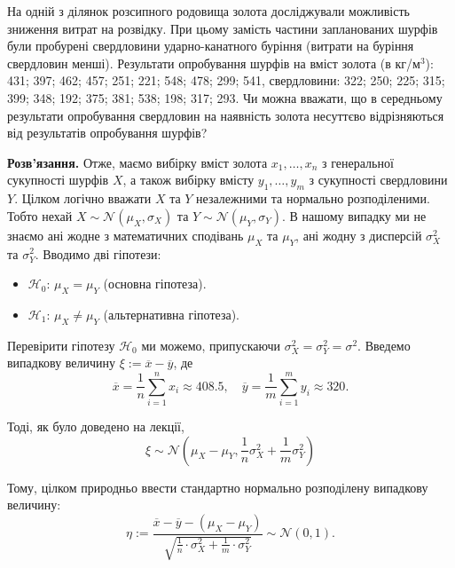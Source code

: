 \documentclass{../hw_template}
\begin{document}
\begin{problems}
    На одній з ділянок розсипного родовища золота досліджували можливість
зниження витрат на розвідку. При цьому замість частини запланованих
шурфів були пробурені свердловини ударно-канатного буріння (витрати на
буріння свердловин менші). Результати опробування шурфів на вміст золота
(в кг/$\text{м}^3$): 431; 397; 462; 457; 251; 221; 548; 478; 299; 541, свердловини: 322; 250;
225; 315; 399; 348; 192; 375; 381; 538; 198; 317; 293.
Чи можна вважати, що в середньому результати опробування свердловин на
наявність золота несуттєво відрізняються від результатів опробування шурфів?
\end{problems}

\textbf{Розв'язання.} Отже, маємо вибірку вміст золота $x_1,\dots,x_n$ з генеральної 
сукупності шурфів $X$, а також вибірку вмісту $y_1,\dots,y_m$ з сукупності
свердловини  $Y$. Цілком логічно вважати $X$ та $Y$ незалежними та 
нормально розподіленими. Тобто нехай $X \sim \mathcal{N}(\mu_X,\sigma_X)$ та 
$Y \sim \mathcal{N}(\mu_Y,\sigma_Y)$. В нашому випадку ми не знаємо ані жодне 
з математичних сподівань $\mu_X$ та $\mu_Y$, ані жодну з дисперсій $\sigma_X^2$ та $\sigma_Y^2$.
Вводимо дві гіпотези:
\begin{itemize}
    \item $\mathcal{H}_0$: $\mu_X = \mu_Y$ (основна гіпотеза).
    \item $\mathcal{H}_1$: $\mu_X \neq \mu_Y$ (альтернативна гіпотеза).
\end{itemize}

Перевірити гіпотезу $\mathcal{H}_0$ ми можемо, припускаючи $\sigma_X^2 = \sigma_Y^2 = \sigma^2$. Введемо випадкову величину $\xi := \overline{x} - \overline{y}$, де
\begin{equation*}
    \overline{x} = \frac{1}{n}\sum_{i=1}^n x_i \approx 408.5, \quad \overline{y} = \frac{1}{m}\sum_{i=1}^m y_i \approx 320.
\end{equation*}

Тоді, як було доведено на лекції, 
\begin{equation*}
    \xi \sim \mathcal{N}\left(\mu_X - \mu_Y, \frac{1}{n}\sigma_X^2 + \frac{1}{m}\sigma_Y^2\right)
\end{equation*}

Тому, цілком природньо ввести стандартно нормально розподілену випадкову величину:
\begin{equation*}
    \eta := \frac{\overline{x} - \overline{y} - (\mu_X - \mu_Y)}{\sqrt{\frac{1}{n} \cdot \sigma_X^2 + \frac{1}{m} \cdot \sigma_Y^2}} \sim \mathcal{N}(0,1).
\end{equation*}
\end{document}
